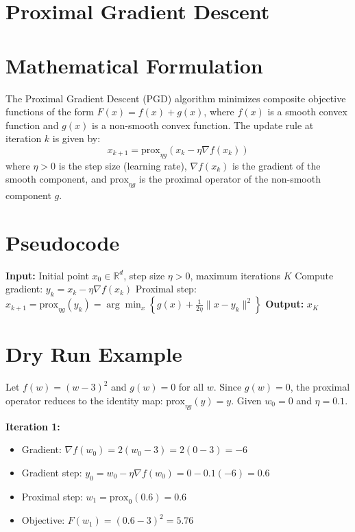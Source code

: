 \documentclass{article}
\begin{document}
\section*{Proximal Gradient Descent}
\section*{Mathematical Formulation}
The Proximal Gradient Descent (PGD) algorithm minimizes composite objective functions of the form $F(x) = f(x) + g(x)$, where $f(x)$ is a smooth convex function and $g(x)$ is a non-smooth convex function. The update rule at iteration $k$ is given by:
\begin{equation}
x_{k+1} = \text{prox}_{\eta g} \left( x_k - \eta \nabla f(x_k) \right)
\end{equation}
where $\eta > 0$ is the step size (learning rate), $\nabla f(x_k)$ is the gradient of the smooth component, and $\text{prox}_{\eta g}$ is the proximal operator of the non-smooth component $g$.

\section*{Pseudocode}
\begin{algorithm}[H]
\caption{Proximal Gradient Descent}
\begin{algorithmic}[1]
\State \textbf{Input:} Initial point $x_0 \in \mathbb{R}^d$, step size $\eta > 0$, maximum iterations $K$
\State Compute gradient: $y_k = x_k - \eta \nabla f(x_k)$
\State Proximal step: $x_{k+1} = \text{prox}_{\eta g}(y_k) = \arg\min_{x} \left\{ g(x) + \frac{1}{2\eta} \|x - y_k\|^2 \right\}$
\EndFor
\State \textbf{Output:} $x_K$
\end{algorithmic}
\end{algorithm}

\section*{Dry Run Example}
Let $f(w) = (w-3)^2$ and $g(w) = 0$ for all $w$. Since $g(w) = 0$, the proximal operator reduces to the identity map: $\text{prox}_{\eta g}(y) = y$. Given $w_0 = 0$ and $\eta = 0.1$.

\textbf{Iteration 1:}
\begin{itemize}
\item Gradient: $\nabla f(w_0) = 2(w_0 - 3) = 2(0 - 3) = -6$
\item Gradient step: $y_0 = w_0 - \eta \nabla f(w_0) = 0 - 0.1(-6) = 0.6$
\item Proximal step: $w_1 = \text{prox}_{0}(0.6) = 0.6$
\item Objective: $F(w_1) = (0.6 - 3)^2 = 5.76$
\end{itemize}
\end{document}
